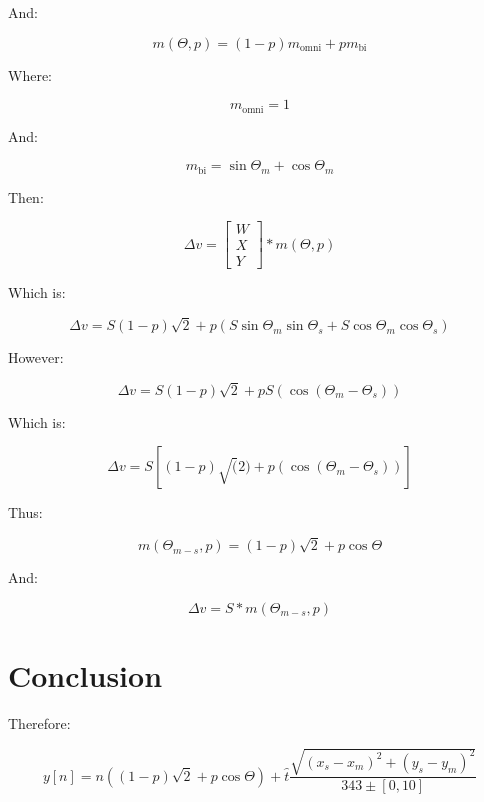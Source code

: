 \documentclass[fleqn]{IEEEtran}
\begin{document}
	And:
	
	\begin{equation}
		m(\Theta, p) = (1-p)m_\text{omni} + pm_\text{bi}
	\end{equation}
	
	Where:
	
	\begin{equation}
		m_\text{omni} = 1
	\end{equation}
	
	And:
	
	\begin{equation}
		m_\text{bi} = \sin{\Theta_m} + \cos{\Theta_m }
	\end{equation}
	
	Then:
	
	\begin{equation}
		\Delta{}v = \begin{bmatrix} W \\ X \\ Y \end{bmatrix} * m(\Theta, p)
	\end{equation}
	
	Which is:
	
	\begin{equation}
		\Delta{}v = S(1 - p)\sqrt{2} + p(S\sin{\Theta_m}\sin{\Theta_s} + S\cos{\Theta_m}\cos{\Theta_s})
	\end{equation}
	
	However:
	
	\begin{equation}
		\Delta{}v = S(1 - p)\sqrt{2} + pS(\cos{(\Theta_m - \Theta_s)})
	\end{equation}
	
	Which is:
	
	\begin{equation}
		\Delta{}v = S[(1-p)\sqrt(2) + p(\cos{(\Theta_m - \Theta_s)})]
	\end{equation}
	
	Thus:
	
	\begin{equation}
		m(\Theta_{m-s}, p) = (1-p)\sqrt{2} + p\cos{\Theta}
	\end{equation}
	
	And:
	
	\begin{equation}
		\Delta{}v = S * m(\Theta_{m-s}, p)
	\end{equation}

\section{Conclusion}

Therefore:

	\begin{equation}
		y[n] = n((1-p)\sqrt{2} + p\cos{\Theta}) + \hat{t}\frac{
			\sqrt{(x_s - x_m)^2 + (y_s - y_m)^2}
			}
			{
			343 \pm [0,10]
			}
	\end{equation}
\end{document}
